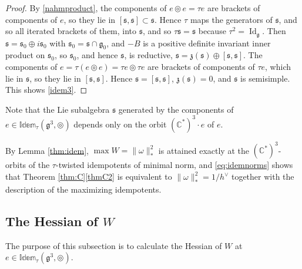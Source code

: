 \documentclass[leqno,10pt]{amsart}
\theoremstyle{definition}
\numberwithin{equation}{section}
\newcommand{\idem}{\mathbb{Idem}}
\newcommand{\tmlt}{\circledcirc}
\newcommand{\om}{\omega}
\newcommand{\id}{\operatorname{Id}}
\newcommand{\g}{\mathfrak{g}}
\newcommand{\com}{\mathbb C}
\newcommand{\gz}{\g_{0}}
\newcommand{\hv}{h^\vee}
\newcommand{\comass}[1]{\lVert #1\rVert_{\ast}}%
\newcommand{\subs}{\mathfrak{s}}
\begin{document}
\begin{proof}
By \eqref{nahmproduct}, the components of $e \tmlt e = \tau e$ are brackets of components of $e$, so they lie in $[\subs, \subs] \subset \subs$. Hence $\tau$ maps the generators of $\subs$, and so all iterated brackets of them, into $\subs$, and so $\tau\subs = \subs$ because $\tau^{2} = \id_{\g}$. Then $\subs = \subs_{0} \oplus i\subs_{0}$ with $\subs_{0} = \subs \cap \gz$, and $-B$ is a positive definite invariant inner product on $\subs_{0}$, so $\subs_{0}$, and hence $\subs$, is reductive, $\subs = \mathfrak{z}(\subs) \oplus [\subs, \subs]$. The components of $e = \tau(e \tmlt e) = \tau e \tmlt \tau e$ are brackets of components of $\tau e$, which lie in $\subs$, so they lie in $[\subs, \subs]$. Hence $\subs = [\subs, \subs]$, $\mathfrak{z}(\subs) = 0$, and $\subs$ is semisimple. This shows \ref{idem3}.
\end{proof}

Note that the Lie subalgebra $\subs$ generated by the components of $e \in \idem_{\tau}(\g^{3}, \tmlt)$ depends only on the orbit $(\com^{\ast})^{3}\cdot e$ of $e$.

By Lemma \ref{thm:idem}, $\max W = \comass{\om}^{2}$ is attained exactly at the $(\com^{\ast})^{3}$-orbits of the $\tau$-twisted idempotents of minimal norm, and \eqref{eq:idemnorms} shows that Theorem \ref{thm:C}\ref{thmC2} is equivalent to $\comass{\om}^{2} = 1/\hv$ together with the description of the maximizing idempotents.

\subsection{The Hessian of $W$}\label{sec:hessian}
The purpose of this subsection is to calculate the Hessian of $W$ at $e \in \idem_{\tau}(\g^{3}, \tmlt)$.
\end{document}
